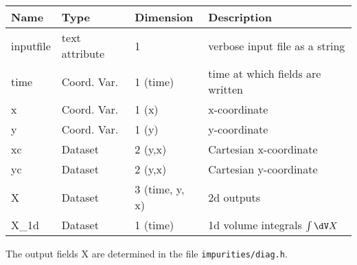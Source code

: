 \begin{longtable}{lll>{\RaggedRight}p{7cm}}
\toprule
\rowcolor{gray!50}\textbf{Name} &  \textbf{Type} & \textbf{Dimension} & \textbf{Description}  \\ \midrule
inputfile        & text attribute & 1 & verbose input file as a string \\
time             & Coord. Var. & 1 (time) & time at which fields are written \\
x                & Coord. Var. & 1 (x) & x-coordinate  \\
y                & Coord. Var. & 1 (y) & y-coordinate \\
xc               & Dataset & 2 (y,x) & Cartesian x-coordinate  \\
yc               & Dataset & 2 (y,x) & Cartesian y-coordinate \\
X                & Dataset & 3 (time, y, x) & 2d outputs \\
X\_1d            & Dataset & 1 (time) & 1d volume integrals $\int \dV X$ \\
\bottomrule
\end{longtable}
The output fields X are determined in the file \texttt{impurities/diag.h}.


